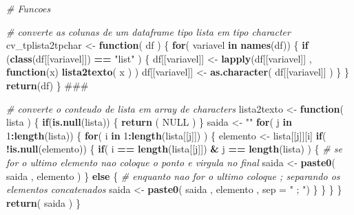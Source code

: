 \documentclass[]{article}
\newenvironment{Shaded}{\begin{snugshade}}{\end{snugshade}}
\newcommand{\KeywordTok}[1]{\textcolor[rgb]{0.13,0.29,0.53}{\textbf{#1}}}
\newcommand{\DataTypeTok}[1]{\textcolor[rgb]{0.13,0.29,0.53}{#1}}
\newcommand{\DecValTok}[1]{\textcolor[rgb]{0.00,0.00,0.81}{#1}}
\newcommand{\StringTok}[1]{\textcolor[rgb]{0.31,0.60,0.02}{#1}}
\newcommand{\CommentTok}[1]{\textcolor[rgb]{0.56,0.35,0.01}{\textit{#1}}}
\newcommand{\OtherTok}[1]{\textcolor[rgb]{0.56,0.35,0.01}{#1}}
\newcommand{\ControlFlowTok}[1]{\textcolor[rgb]{0.13,0.29,0.53}{\textbf{#1}}}
\newcommand{\OperatorTok}[1]{\textcolor[rgb]{0.81,0.36,0.00}{\textbf{#1}}}
\newcommand{\NormalTok}[1]{#1}
\begin{document}
\begin{Shaded}
\begin{Highlighting}[]
\CommentTok{# Funcoes }

\CommentTok{# converte as colunas de um dataframe tipo lista em tipo character}
\NormalTok{cv_tplista2tpchar <-}\StringTok{ }\ControlFlowTok{function}\NormalTok{( df  ) \{ }
  \ControlFlowTok{for}\NormalTok{( variavel }\ControlFlowTok{in} \KeywordTok{names}\NormalTok{(df)) \{}
    \ControlFlowTok{if}\NormalTok{ (}\KeywordTok{class}\NormalTok{(df[[variavel]]) }\OperatorTok{==}\StringTok{ "list"}\NormalTok{ ) \{}
\NormalTok{      df[[variavel]] <-}\StringTok{ }\KeywordTok{lapply}\NormalTok{(df[[variavel]] ,   }\ControlFlowTok{function}\NormalTok{(x)   }\KeywordTok{lista2texto}\NormalTok{( x  ) ) }
\NormalTok{      df[[variavel]] <-}\StringTok{ }\KeywordTok{as.character}\NormalTok{( df[[variavel]] )}
\NormalTok{    \}}
\NormalTok{  \}}
  \KeywordTok{return}\NormalTok{(df)}
\NormalTok{\}}
\NormalTok{###}


\CommentTok{# converte o conteudo de lista em array de characters}
\NormalTok{lista2texto <-}\StringTok{ }\ControlFlowTok{function}\NormalTok{( lista  ) \{}
  \ControlFlowTok{if}\NormalTok{(}\KeywordTok{is.null}\NormalTok{(lista)) \{}
    \KeywordTok{return}\NormalTok{ ( }\OtherTok{NULL}\NormalTok{ )}
\NormalTok{  \}}
\NormalTok{  saida <-}\StringTok{ ""}
  \ControlFlowTok{for}\NormalTok{( j }\ControlFlowTok{in} \DecValTok{1}\OperatorTok{:}\KeywordTok{length}\NormalTok{(lista)) \{ }
    \ControlFlowTok{for}\NormalTok{( i }\ControlFlowTok{in} \DecValTok{1}\OperatorTok{:}\KeywordTok{length}\NormalTok{(lista[[j]]) ) \{}
\NormalTok{      elemento <-}\StringTok{ }\NormalTok{lista[[j]][i] }
      \ControlFlowTok{if}\NormalTok{( }\OperatorTok{!}\KeywordTok{is.null}\NormalTok{(elemento)) \{ }
        \ControlFlowTok{if}\NormalTok{( i }\OperatorTok{==}\StringTok{ }\KeywordTok{length}\NormalTok{(lista[[j]]) }\OperatorTok{&}\StringTok{ }\NormalTok{j }\OperatorTok{==}\StringTok{ }\KeywordTok{length}\NormalTok{(lista)  ) \{ }
          \CommentTok{# se for o ultimo elemento nao coloque o ponto e virgula no final            }
\NormalTok{          saida <-}\StringTok{ }\KeywordTok{paste0}\NormalTok{( saida , elemento  )}
\NormalTok{        \} }\ControlFlowTok{else}\NormalTok{ \{}
          \CommentTok{# enquanto nao for o ultimo coloque ; separando os elementos concatenados }
\NormalTok{          saida <-}\StringTok{ }\KeywordTok{paste0}\NormalTok{( saida , elemento , }\DataTypeTok{sep =} \StringTok{" ; "}\NormalTok{)}
\NormalTok{        \}}
\NormalTok{      \}  }
\NormalTok{    \}}
\NormalTok{  \}}
  \KeywordTok{return}\NormalTok{( saida )}
\NormalTok{\}}


\end{Highlighting}
\end{Shaded}
\end{document}
